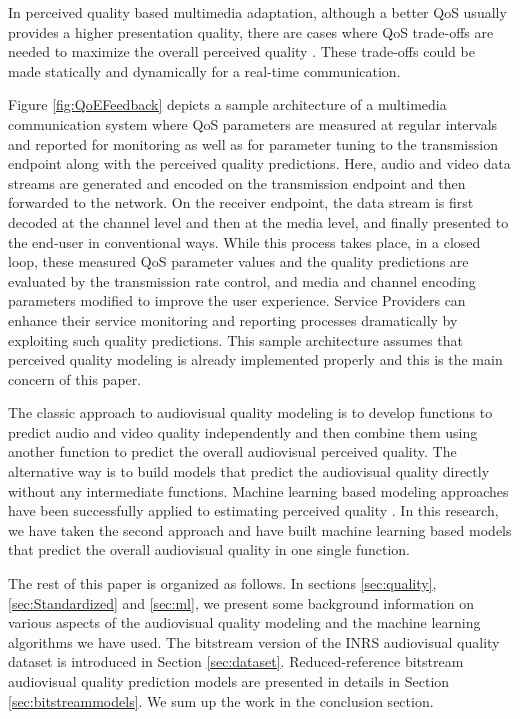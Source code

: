 \documentclass[journal]{IEEEtran}
\begin{document}
In perceived quality based multimedia adaptation, although a better QoS usually provides a higher presentation quality, there are cases where QoS trade-offs are needed to maximize the overall perceived quality \cite{hansen2013assessing}. These trade-offs could be made statically and dynamically for a real-time communication.

Figure \ref{fig:QoEFeedback} depicts a sample architecture of a multimedia communication system where QoS parameters are measured at regular intervals and reported for monitoring as well as for parameter tuning to the transmission endpoint along with the perceived quality predictions. Here, audio and video data streams are generated and encoded on the transmission endpoint and then forwarded to the network. On the receiver endpoint, the data stream is first decoded at the channel level and then at the media level, and finally presented to the end-user in conventional ways. While this process takes place, in a closed loop, these measured QoS parameter values and the quality predictions are evaluated by the transmission rate control, and media and channel encoding parameters modified to improve the user experience. Service Providers can enhance their service monitoring and reporting processes dramatically by exploiting such quality predictions. This sample architecture assumes that perceived quality modeling is already implemented properly and this is the main concern of this paper.

The classic approach to audiovisual quality modeling is to develop functions to predict audio and video quality independently and then combine them using another function to predict the overall audiovisual perceived quality. The alternative way is to build models that predict the audiovisual quality directly without any intermediate functions. Machine learning based modeling approaches have been successfully applied to estimating perceived quality \cite{aroussi2014survey} \cite{maki2013reduced}. In this research, we have taken the second approach and have built machine learning based models that predict the overall audiovisual quality in one single function.

The rest of this paper is organized as follows. In sections \ref{sec:quality}, \ref{sec:Standardized} and \ref{sec:ml}, we present some background information on various aspects of the audiovisual quality modeling and the machine learning algorithms we have used. The bitstream version of the INRS audiovisual quality dataset is introduced in Section \ref{sec:dataset}. Reduced-reference bitstream audiovisual quality prediction models are presented in details in Section \ref{sec:bitstreammodels}. We sum up the work in the conclusion section.
\end{document}
